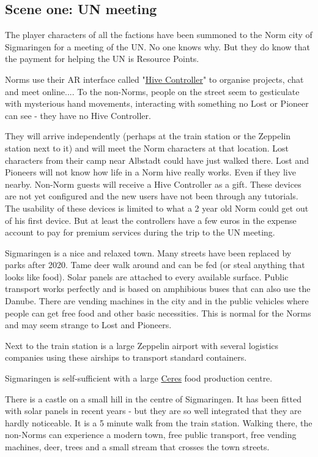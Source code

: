 \subsection{Scene one: UN meeting}

The player characters of all the factions have been summoned to the Norm city of Sigmaringen for a meeting of the UN. No one knows why. But they do know that the payment for helping the UN is Resource Points.

Norms use their AR interface called "\hyperref[sec:Hive Controller]{Hive Controller}" to organise projects, chat and meet online.... To the non-Norms, people on the street seem to gesticulate with mysterious hand movements, interacting with something no Lost or Pioneer can see - they have no Hive Controller.

They will arrive independently (perhaps at the train station or the Zeppelin station next to it) and will meet the Norm characters at that location. Lost characters from their camp near Albstadt could have just walked there. Lost and Pioneers will not know how life in a Norm hive really works. Even if they live nearby.
Non-Norm guests will receive a Hive Controller as a gift. These devices are not yet configured and the new users have not been through any tutorials. The usability of these devices is limited to what a 2 year old Norm could get out of his first device. But at least the controllers have a few euros in the expense account to pay for premium services during the trip to the UN meeting.

Sigmaringen is a nice and relaxed town. Many streets have been replaced by parks after 2020. Tame deer walk around and can be fed (or steal anything that looks like food). Solar panels are attached to every available surface. Public transport works perfectly and is based on amphibious buses that can also use the Danube. There are vending machines in the city and in the public vehicles where people can get free food and other basic necessities. This is normal for the Norms and may seem strange to Lost and Pioneers.

Next to the train station is a large Zeppelin airport with several logistics companies using these airships to transport standard containers.

Sigmaringen is self-sufficient with a large \hyperref[sec: norm food]{Ceres} food production centre.

There is a castle on a small hill in the centre of Sigmaringen. It has been fitted with solar panels in recent years - but they are so well integrated that they are hardly noticeable. It is a 5 minute walk from the train station. Walking there, the non-Norms can experience a modern town, free public transport, free vending machines, deer, trees and a small stream that crosses the town streets.

